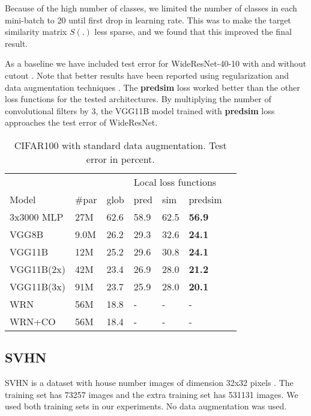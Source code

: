 \documentclass{article}
\begin{document}
Because of the high number of classes, we limited the number of classes in each mini-batch to 20 until first drop in learning rate. This was to make the  target similarity matrix $S(.)$ less sparse, and we found that this improved the final result.

As a baseline we have included test error for WideResNet-40-10 with and without cutout \cite{DevriesT17}. Note that better results have been reported using regularization and data augmentation techniques  \cite{YamadaIK18,CubukZMVL18}. The \textbf{predsim} loss worked better than the other loss functions for the tested architectures. By multiplying the number of convolutional filters by 3, the VGG11B model trained with \textbf{predsim} loss approaches the test error of WideResNet.

\begin{table}[h]
  \caption{CIFAR100 with standard data augmentation. Test error in percent.}
  \label{table:cifar100}
  \centering
  \begin{tabular}{lllllll}
    \toprule    
    &&& \multicolumn{3}{|l}{Local loss functions} \\
    Model   & \#par & glob & \multicolumn{1}{|l}{pred} & sim & \multicolumn{1}{l}{predsim}  \\
    \midrule
    3x3000 MLP & 27M &  62.6 & \multicolumn{1}{|l}{58.9} & 62.5  & \textbf{56.9} \\
    VGG8B      & 9.0M &  26.2 & \multicolumn{1}{|l}{29.3} & 32.6 & \textbf{24.1} \\
    VGG11B     & 12M &  25.2 & \multicolumn{1}{|l}{29.6} & 30.8  & \textbf{24.1} \\
    VGG11B(2x) & 42M &  23.4 & \multicolumn{1}{|l}{26.9} & 28.0  & \textbf{21.2} \\
    VGG11B(3x) & 91M & 23.7 & \multicolumn{1}{|l}{25.9} & 28.0 & \textbf{20.1} \\
    \midrule
    WRN        & 56M & 18.8  & \multicolumn{1}{|l}{-} & - & - \\
    WRN+CO     & 56M & 18.4  & \multicolumn{1}{|l}{-} & - & - \\
    \bottomrule
  \end{tabular}
\end{table}

\subsection{SVHN}

SVHN is a dataset with house number images of dimension 32x32 pixels \cite{Netzer2011}. The training set has 73257 images and the extra training set has 531131 images. We used both training sets in our experiments. No data augmentation was used. 
\end{document}
